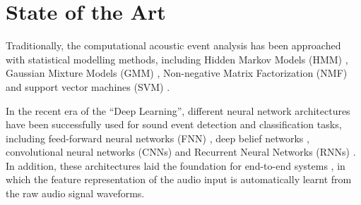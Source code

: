 %







\section{State of the Art}


Traditionally, the computational acoustic event analysis has been approached with statistical modelling methods, including Hidden Markov Models (HMM) \cite{degara2011onset}, Gaussian Mixture Models (GMM) \cite{heittola2010audio}, Non-negative Matrix Factorization (NMF) \cite{carabias2011musical} and support vector machines (SVM) \cite{guo2003content}. 

In the recent era of the ``Deep Learning'', different neural network architectures have been successfully used for sound event detection and classification tasks, including feed-forward neural networks (FNN) \cite{mcloughlin2015robust}, deep belief networks \cite{mohamed2012acoustic}, convolutional neural networks (CNNs) \cite{piczak2015environmental} and Recurrent Neural Networks (RNNs) \cite{graves2013speech}. In addition, these architectures laid the foundation for end-to-end systems \cite{trigeorgis2016adieu, wu2017end}, in which the feature representation of the audio input is automatically learnt from the raw audio signal waveforms. 

